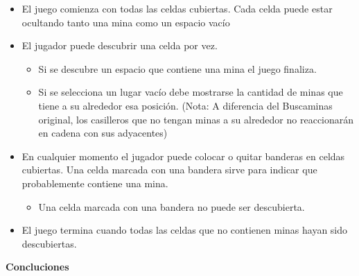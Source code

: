 \documentclass{article}
\begin{document}
	\begin{itemize}
		\item El juego comienza con todas las celdas cubiertas. Cada celda puede estar ocultando tanto una mina como un espacio vac\'io\\
		\item El jugador puede descubrir una celda por vez.\\
			\begin{itemize}
				\item Si se descubre un espacio que contiene una mina el juego finaliza. \\
				\item Si se selecciona un lugar vac\'io debe mostrarse la cantidad de minas que tiene a su alrededor esa posici\'on. (Nota: A diferencia del Buscaminas original, los casilleros que no tengan minas a su alrededor no reaccionar\'an en cadena con sus adyacentes)
			\end{itemize}
		\item En cualquier momento el jugador puede colocar o quitar banderas en celdas cubiertas. Una celda marcada con una bandera sirve para indicar que probablemente contiene una mina. \\	
			\begin{itemize}
				\item Una celda marcada con una bandera no puede ser descubierta.
			\end{itemize}
		\item El juego termina cuando todas las celdas que no contienen minas hayan sido descubiertas.
	
	\end{itemize}
 \newpage
 
 
 \begin{Huge}
	\begin{center}
		\textbf{Concluciones \\[1cm]}
	\end{center}	 
\end{Huge}
\end{document}
